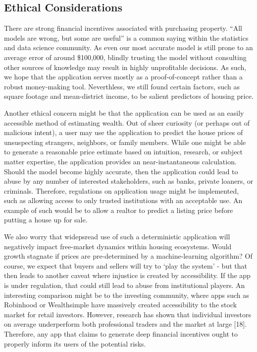 \documentclass[11pt,]{article}
\begin{document}
\hypertarget{ethical-considerations}{%
\subsection{Ethical Considerations}\label{ethical-considerations}}

There are strong financial incentives associated with purchasing
property. ``All models are wrong, but some are useful'' is a common
saying within the statistics and data science community. As even our
most accurate model is still prone to an average error of around
\$100,000, blindly trusting the model without consulting other sources
of knowledge may result in highly unprofitable decisions. As such, we
hope that the application serves mostly as a proof-of-concept rather
than a robust money-making tool. Neverthless, we still found certain
factors, such as square footage and mean-district income, to be salient
predictors of housing price.

Another ethical concern might be that the application can be used as an
easily accessible method of estimating wealth. Out of sheer curiosity
(or perhaps out of malicious intent), a user may use the application to
predict the house prices of unsuspecting strangers, neighbors, or family
members. While one might be able to generate a reasonable price estimate
based on intuition, research, or subject matter expertise, the
application provides an near-instantaneous calculation. Should the model
become highly accurate, then the application could lead to abuse by any
number of interested stakeholders, such as banks, private loaners, or
criminals. Therefore, regulations on application usage might be
implemented, such as allowing access to only trusted institutions with
an acceptable use. An example of such would be to allow a realtor to
predict a listing price before putting a house up for sale.

We also worry that widepsread use of such a deterministic application
will negatively impact free-market dynamics within housing ecosystems.
Would growth stagnate if prices are pre-determined by a machine-learning
algorithm? Of course, we expect that buyers and sellers will try to
`play the system' - but that then leads to another caveat where
injustice is created by accessibility. If the app is under regulation,
that could still lead to abuse from institutional players. An
interesting comparison might be to the investing community, where apps
such as Robinhood or Wealthsimple have massively created accessibility
to the stock market for retail investors. However, research has shown
that individual investors on average underperform both professional
traders and the market at large {[}18{]}. Therefore, any app that claims
to generate deep financial incentives ought to properly inform its users
of the potential risks.
\end{document}
